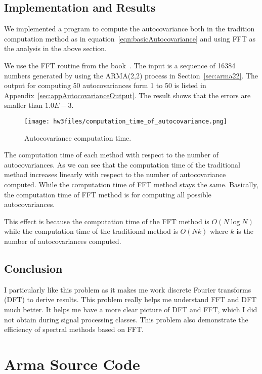 \documentclass{article}
\begin{document}
\subsection{Implementation and Results}
 We implemented a program to compute the autocovariance both in the tradition
 computation method as in equation~\ref{eqn:basicAutocovariance} and using FFT
 as the analysis in the above section.
 
 We use the FFT routine from the book~\cite{PressNumericalRecipes}. The input
 is a sequence of 16384 numbers generated by using the ARMA(2,2) process in
 Section~\ref{sec:arma22}. The output for computing 50 autocovariances form 1
 to 50 is listed in Appendix~\ref{sec:appAutocovarianceOutput}. The result
 shows that the errors are smaller than $1.0E-3$.
 
 \begin{figure}[ht!]
\centering
\texttt{[image: hw3files/computation\_time\_of\_autocovariance.png]}
\caption{Autocovariance computation time.}
\label{fig:openFileDlg}
\end{figure}

The computation time of each method with respect to the number of
autocovariances. As we can see that the computation time of the traditional
method increases linearly with respect to the number of autocovariance computed.
While the computation time of FFT method stays the same. Basically, the
computation time of FFT method is for computing all possible autocovariances.

This effect is because the computation time of the FFT method is $O(N\log N)$
while the computation time of the traditional method is $O(Nk)$ where $k$ is
the number of autocovariances computed.

\subsection{Conclusion}

I particularly like this problem as it makes me work discrete Fourier
transforms (DFT) to derive results. This problem really helps me understand FFT
and DFT much better. It helps me have a more clear picture of DFT and FFT,
which I did not obtain during signal processing classes. This problem also
demonstrate the efficiency of spectral methods based on FFT.



\appendix
\section{Arma Source Code}
\end{document}
